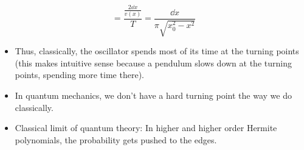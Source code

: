 \documentclass[../notes.tex]{subfiles}
\begin{document}
\begin{itemize}
\begin{itemize}
\begin{equation*}
            = \frac{\frac{2\dd{x}}{v(x)}}{T}
            = \frac{\dd{x}}{\pi\sqrt{x_0^2-x^2}}
        \end{equation*}
        \begin{itemize}
            \item Thus, classically, the oscillator spends most of its time at the turning points (this makes intuitive sense because a pendulum slows down at the turning points, spending more time there).
            \item In quantum mechanics, we don't have a hard turning point the way we do classically.
            \item Classical limit of quantum theory: In higher and higher order Hermite polynomials, the probability gets pushed to the edges.
        \end{itemize}
    \end{itemize}
\end{itemize}
\end{document}
